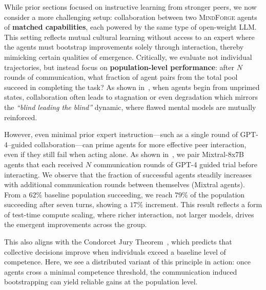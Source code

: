 \documentclass{article}
\newcommand{\collabvoyager}[0]{\mbox{\textsc{MindForge}}\xspace}
\begin{document}
While prior sections focused on instructive learning from stronger peers, we now consider a more challenging setup: collaboration between two \collabvoyager agents of \textbf{matched capabilities}, each powered by the same type of open-weight LLM. This setting reflects mutual cultural learning without access to an expert where the agents must bootstrap improvements solely through interaction, thereby mimicking certain qualities of emergence.
Critically, we evaluate not individual trajectories, but instead focus on \textbf{population-level performance}:  after \(N\) rounds of communication, what fraction of agent pairs from the total pool succeed in completing the task? As shown in~, when agents begin from unprimed states, collaboration often leads to stagnation or even degradation which mirrors the \textit{``blind leading the blind''} dynamic, where flawed mental models are mutually reinforced. 

However, even minimal prior expert instruction—such as a single round of GPT-4–guided collaboration—can prime agents for more effective peer interaction, even if they still fail when acting alone. As shown in~, we pair Mixtral-8x7B agents that each received \(N\) communication rounds of GPT-4 guided trial before interacting. We observe  that the fraction of successful agents steadily increases with additional communication rounds between themselves (Mixtral agents). From a \(62\%\) baseline population succeeding, we reach \(79\%\)  of the population succeeding after seven turns, showing a \(17\%\) increment. This result reflects a form of test-time compute scaling, where richer interaction, not larger models, drives the emergent improvements across the group.

This also aligns with the Condorcet Jury Theorem~\citep{austen1996information}, which predicts that collective decisions improve when individuals exceed a baseline level of competence. Here, we see a distributed variant of this principle in action: once agents cross a minimal competence threshold, the communication induced bootstrapping can yield reliable gains at the population level.


\end{document}

